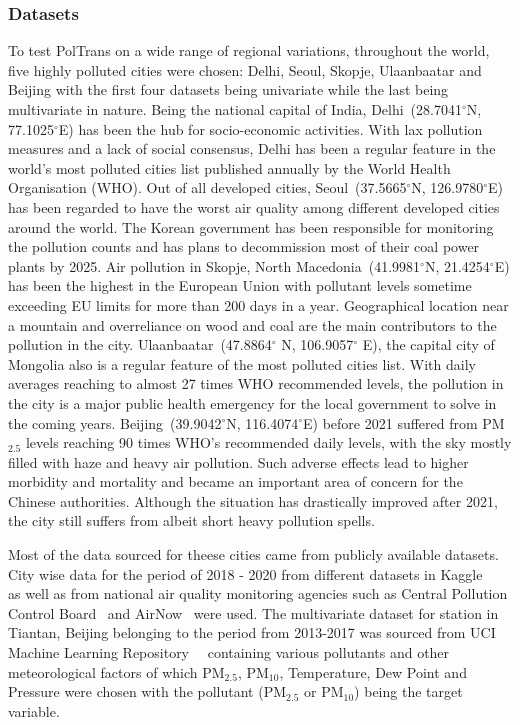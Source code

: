 \documentclass[10pt,journal]{IEEEtran}
\begin{document}
\subsubsection{Datasets}
To test {PolTrans} on a wide range of regional variations, throughout the world, five highly polluted cities were chosen: Delhi, Seoul, Skopje, Ulaanbaatar and Beijing with the first four datasets being univariate while the last being multivariate in nature. Being the national capital of India, Delhi~(28.7041${^{\circ}}$N, 77.1025${^{\circ}}$E) has been the hub for socio-economic activities. With lax pollution measures and a lack of social consensus, Delhi has been a regular feature in the world's most polluted cities list published annually by the World Health Organisation (WHO). Out of all developed cities, Seoul~(37.5665${^{\circ}}$N, 126.9780${^{\circ}}$E) has been regarded to have the worst air quality among different developed cities around the world. The Korean government has been responsible for monitoring the pollution counts and has plans to decommission most of their coal power plants by 2025. Air pollution in Skopje, North Macedonia~(41.9981${^{\circ}}$N, 21.4254${^{\circ}}$E) has been the highest in the European Union with pollutant levels sometime exceeding EU limits for more than 200 days in a year. Geographical location near a mountain and overreliance on wood and coal are the main contributors to the pollution in the city. Ulaanbaatar~(47.8864${^{\circ}}$ N, 106.9057${^{\circ}}$ E), the capital city of Mongolia also is a regular feature of the most polluted cities list. With daily averages reaching to almost 27 times WHO recommended levels, the pollution in the city is a major public health emergency for the local government to solve in the coming years. Beijing~(39.9042${^{\circ}}$N, 116.4074${^{\circ}}$E) before 2021 suffered from PM${_{2.5}}$ levels reaching 90 times WHO's recommended daily levels, with the sky mostly filled with haze and heavy air pollution. Such adverse effects lead to higher morbidity and mortality and became an important area of concern for the Chinese authorities. Although the situation has drastically improved after 2021, the city still suffers from albeit short heavy pollution spells.

Most of the data sourced for theese cities came from publicly available datasets. City wise data for the period of 2018 - 2020 from different datasets in Kaggle~\cite{Kaggle.Delhi}~\cite{Kaggle.Seoul}~\cite{Kaggle.Skopje}~\cite{Kaggle.Ulaanbaatar} as well as from national air quality monitoring agencies such as Central Pollution Control Board~\cite{CPCB} and AirNow~\cite{AirNow} were used. The multivariate dataset for station in Tiantan, Beijing belonging to the period from 2013-2017 was sourced from UCI Machine Learning Repository~\cite{UCI.2017}~\cite{Zhang.2017} containing various pollutants and other meteorological factors of which PM${_{2.5}}$, PM${_{10}}$, Temperature, Dew Point and Pressure were chosen with the pollutant (PM${_{2.5}}$ or PM${_{10}}$) being the target variable.
\end{document}
